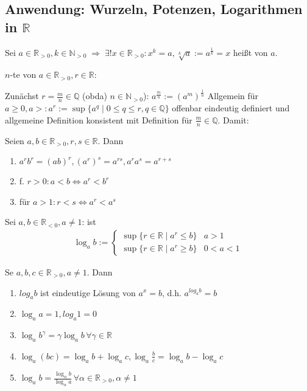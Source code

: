 \subsection*{Anwendung: Wurzeln, Potenzen, Logarithmen in $\mathbb{R}$}
\begin{proposition}[Wurzeln]
	Sei $a\in\mathbb{R}_{>0}, k\in\mathbb{N}_{>0} \;\Rightarrow \; \exists ! x\in \mathbb{R}_{>0}: x^k = a, \sqrt[k]{a}:=a^{\frac{1}{k}} = x$ heißt   von $a$.
\end{proposition}
\begin{definition}[Potenz]
	$n$-te  von $a\in\mathbb{R}_{>0}, r\in\mathbb{R}$:
	
	Zunächst $r=\frac{m}{n}\in\mathbb{Q}$ (\gls{obda}) $n\in\mathbb{N}_{>0}$): $ a^{\frac{m}{n}}:= (a^m)^{\frac{1}{n}}$
	Allgemein für $a\ge 0, a > : a^r := \sup \{ a^q \mid 0 \le q \le r,q\in\mathbb{Q} \}$
	offenbar eindeutig definiert und allgemeine Definition konsistent mit Definition für $\frac{m}{n}\in\mathbb{Q}$.
	Damit: 
\end{definition}
\begin{proposition}\label{proposition_potenz_r}
	Seien $a,b\in\mathbb{R}_{>0}, r,s\in\mathbb{R}$. Dann
	\begin{enumerate}[label={\arabic*)}]
		\item $a^r b^r = (ab)^r, (a^r)^s = a^{rs}, a^ra^s = a^{r+s}$
		\item f. $r > 0: a < b \Leftrightarrow a^r < b^r$
		\item für $a > 1: r < s \Leftrightarrow a^r < a^s$
	\end{enumerate}
\end{proposition}

\begin{definition}[Logarithmus]
	Sei $a,b\in\mathbb{R}_{<0}, a\neq 1$:  ist \begin{align*}
	 \log_a b :=\begin{cases}
	 \sup \{ r \in \mathbb{R} \mid a^r \le b\}& a > 1\\
 	\sup \{r\in\mathbb{R}\mid a^r \ge b\}& 0 < a < 1
	 \end{cases}
	\end{align*}
\end{definition}
\begin{proposition}\label{proposition_logarithmus_r}
	Se $a,b,c\in\mathbb{R}_{>0}, a\neq 1$. Dann
	\begin{enumerate}[label={\arabic*)}]
		\item $log_a b$ ist eindeutige Lösung von $a^x = b$, d.h. $a^{log_a b} = b$
		\item $\log_a a = 1, log_a 1 = 0$
		\item $\log_a b^\gamma = \gamma \log_a b \,\forall \gamma\in\mathbb{R}$
		\item $\log_a(bc) = \log_a b + \log_a c, \log_a \frac{b}{c} = \log_a b - \log_a c$
		\item $\log_a b = \frac{\log_\alpha b}{\log_\alpha a}\,\forall \alpha\in\mathbb{R}_{>0},\alpha\neq 1$
	\end{enumerate}
\end{proposition}

